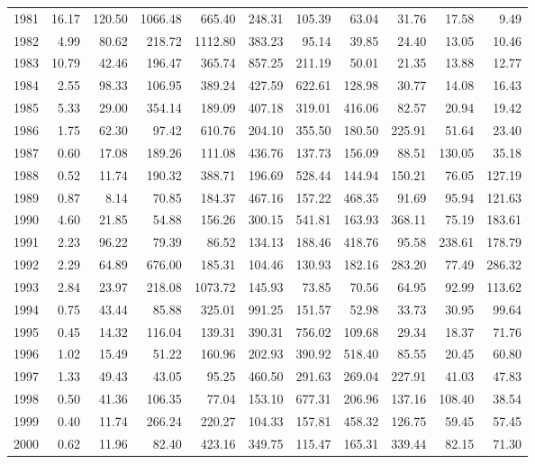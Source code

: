 \documentclass[]{article}
\begin{document}
\begin{table}[ht]
{\begin{tabular}{rrrrrrrrrrr}
  1981 & 16.17 & 120.50 & 1066.48 & 665.40 & 248.31 & 105.39 & 63.04 & 31.76 & 17.58 & 9.49 \\ 
  1982 & 4.99 & 80.62 & 218.72 & 1112.80 & 383.23 & 95.14 & 39.85 & 24.40 & 13.05 & 10.46 \\ 
  1983 & 10.79 & 42.46 & 196.47 & 365.74 & 857.25 & 211.19 & 50.01 & 21.35 & 13.88 & 12.77 \\ 
  1984 & 2.55 & 98.33 & 106.95 & 389.24 & 427.59 & 622.61 & 128.98 & 30.77 & 14.08 & 16.43 \\ 
  1985 & 5.33 & 29.00 & 354.14 & 189.09 & 407.18 & 319.01 & 416.06 & 82.57 & 20.94 & 19.42 \\ 
  1986 & 1.75 & 62.30 & 97.42 & 610.76 & 204.10 & 355.50 & 180.50 & 225.91 & 51.64 & 23.40 \\ 
  1987 & 0.60 & 17.08 & 189.26 & 111.08 & 436.76 & 137.73 & 156.09 & 88.51 & 130.05 & 35.18 \\ 
  1988 & 0.52 & 11.74 & 190.32 & 388.71 & 196.69 & 528.44 & 144.94 & 150.21 & 76.05 & 127.19 \\ 
  1989 & 0.87 & 8.14 & 70.85 & 184.37 & 467.16 & 157.22 & 468.35 & 91.69 & 95.94 & 121.63 \\ 
  1990 & 4.60 & 21.85 & 54.88 & 156.26 & 300.15 & 541.81 & 163.93 & 368.11 & 75.19 & 183.61 \\ 
  1991 & 2.23 & 96.22 & 79.39 & 86.52 & 134.13 & 188.46 & 418.76 & 95.58 & 238.61 & 178.79 \\ 
  1992 & 2.29 & 64.89 & 676.00 & 185.31 & 104.46 & 130.93 & 182.16 & 283.20 & 77.49 & 286.32 \\ 
  1993 & 2.84 & 23.97 & 218.08 & 1073.72 & 145.93 & 73.85 & 70.56 & 64.95 & 92.99 & 113.62 \\ 
  1994 & 0.75 & 43.44 & 85.88 & 325.01 & 991.25 & 151.57 & 52.98 & 33.73 & 30.95 & 99.64 \\ 
  1995 & 0.45 & 14.32 & 116.04 & 139.31 & 390.31 & 756.02 & 109.68 & 29.34 & 18.37 & 71.76 \\ 
  1996 & 1.02 & 15.49 & 51.22 & 160.96 & 202.93 & 390.92 & 518.40 & 85.55 & 20.45 & 60.80 \\ 
  1997 & 1.33 & 49.43 & 43.05 & 95.25 & 460.50 & 291.63 & 269.04 & 227.91 & 41.03 & 47.83 \\ 
  1998 & 0.50 & 41.36 & 106.35 & 77.04 & 153.10 & 677.31 & 206.96 & 137.16 & 108.40 & 38.54 \\ 
  1999 & 0.40 & 11.74 & 266.24 & 220.27 & 104.33 & 157.81 & 458.32 & 126.75 & 59.45 & 57.45 \\ 
  2000 & 0.62 & 11.96 & 82.40 & 423.16 & 349.75 & 115.47 & 165.31 & 339.44 & 82.15 & 71.30 \\ 

\end{tabular}}
\end{table}
\end{document}
